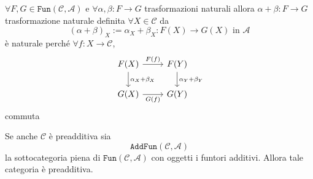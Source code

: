     \(\forall F, G \in \mathtt{Fun}{(\mathcal{\mathcal{C}}, \mathcal{A})}\) e \(\forall \alpha, \beta : F \to G\) trasformazioni
    naturali allora \(\alpha + \beta : F \to G\) trasformazione naturale
    definita \(\forall X \in \mathcal{\mathcal{C}}\) da
    \[
      {(\alpha + \beta)}_X := \alpha_X + \beta_X : F{(X)} \to G{(X)} \text{ in }
      \mathcal{A}
    \]
    è naturale perché \(
    \forall f : X \to \mathcal{C}\), 
\[\begin{tikzcd}
	{F(X)} & {F(Y)} \\
	{G{(X)}} & {G{(Y)}}
	\arrow["{F(f)}", from=1-1, to=1-2]
	\arrow["{\alpha_X + \beta_X}", from=1-1, to=2-1]
	\arrow["{\alpha_Y + \beta_Y}", from=1-2, to=2-2]
	\arrow["{G{(f)}}"', from=2-1, to=2-2]
\end{tikzcd}\]
commuta

Se anche \(\mathcal{\mathcal{C}}\) è preadditiva sia 
\[
  \mathtt{AddFun}{(\mathcal{\mathcal{C}}, \mathcal{A})}
\]
la sottocategoria piena di \(\mathtt{Fun}{(\mathcal{\mathcal{C}}, \mathcal{A})}\) con 
oggetti i funtori additivi. Allora tale categoria è preadditiva.

